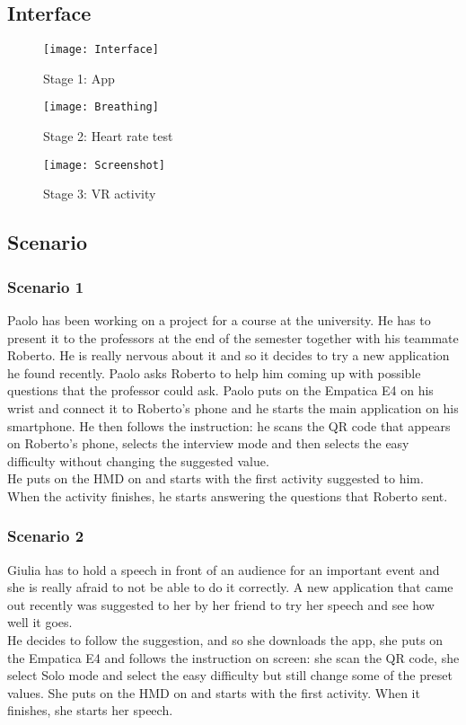 \subsection{Interface}
\begin{figure}[H]
	\centering
	\texttt{[image: Interface]}
	\caption{Stage 1: App}
\end{figure}

\begin{figure}[H]
	\centering
	\texttt{[image: Breathing]}
	\caption{Stage 2: Heart rate test}
\end{figure}

\begin{figure}[H]
	\centering
	\texttt{[image: Screenshot]}
	\caption{Stage 3: VR activity}
\end{figure}
\subsection{Scenario}
\subsubsection{Scenario 1}
Paolo has been working on a project for a course at the university. He has to present it to the professors at the end of the semester together with his teammate Roberto. He is really nervous about it and so it decides to try a new application he found recently. Paolo asks Roberto to help him coming up with possible questions that the professor could ask. Paolo puts on the Empatica E4 on his wrist and connect it to Roberto's phone and he starts the main application on his smartphone. He then follows the instruction: he scans the QR code that appears on Roberto's phone, selects the interview mode and then selects the easy difficulty without changing the suggested value.\\
He puts on the HMD on and starts with the first activity suggested to him. When the activity finishes, he starts answering the questions that Roberto sent.  

\subsubsection{Scenario 2}
Giulia has to hold a speech in front of an audience for an important event and she is really afraid to not be able to do it correctly. A new application that came out recently was suggested to her by her friend to try her speech and see how well it goes.\\
He decides to follow the suggestion, and so she downloads the app, she puts on the Empatica E4 and follows the instruction on screen: she scan the QR code, she select Solo mode and select the easy difficulty but still change some of the preset values.
She puts on the HMD on and starts with the first activity. When it finishes, she starts her speech.